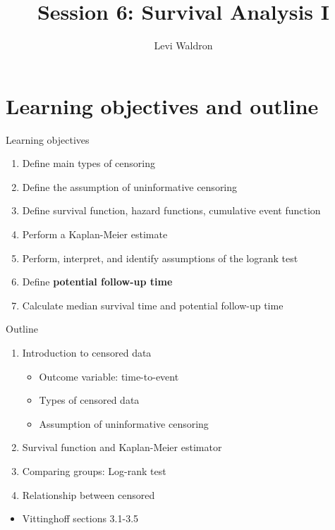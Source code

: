 \documentclass[
  ignorenonframetext,
]{beamer}
\title{Session 6: Survival Analysis I}
\author{Levi Waldron}
\date{}
\institute{CUNY SPH Biostatistics 2}
\providecommand{\tightlist}{%
  \setlength{\itemsep}{0pt}\setlength{\parskip}{0pt}}
\begin{document}
\frame{\titlepage}

\hypertarget{learning-objectives-and-outline}{%
\section{Learning objectives and
outline}\label{learning-objectives-and-outline}}

\begin{frame}{Learning objectives}
\protect\hypertarget{learning-objectives}{}

\begin{enumerate}
\tightlist
\item
  Define main types of censoring
\item
  Define the assumption of uninformative censoring
\item
  Define survival function, hazard functions, cumulative event function
\item
  Perform a Kaplan-Meier estimate
\item
  Perform, interpret, and identify assumptions of the logrank test
\item
  Define \textbf{potential follow-up time}
\item
  Calculate median survival time and potential follow-up time
\end{enumerate}

\end{frame}

\begin{frame}{Outline}
\protect\hypertarget{outline}{}

\begin{enumerate}
\tightlist
\item
  Introduction to censored data

  \begin{itemize}
  \tightlist
  \item
    Outcome variable: time-to-event
  \item
    Types of censored data
  \item
    Assumption of uninformative censoring
  \end{itemize}
\item
  Survival function and Kaplan-Meier estimator
\item
  Comparing groups: Log-rank test
\item
  Relationship between censored
\end{enumerate}

\begin{itemize}
\tightlist
\item
  Vittinghoff sections 3.1-3.5
\end{itemize}

\end{frame}
\end{document}
